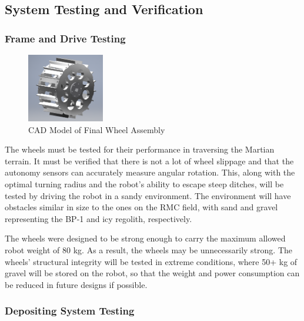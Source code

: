 \documentclass[class=article, crop=false]{standalone}
\begin{document}
	\subsection{System Testing and Verification}
	\label{subsec:system_testing_and_verification}
	
	
	
	\subsubsection{Frame and Drive Testing}
	
	\begin{figure}
		\centering
	 	\includegraphics[width=0.30\textwidth]{09_Figures/final_wheel.png}
	 	\caption{CAD Model of Final Wheel Assembly}
	 	\label{fig:final_wheel}
	\end{figure}	
	
	The wheels must be tested for their performance in traversing the Martian terrain. It must be verified that there is not a lot of wheel slippage and that the autonomy sensors can accurately measure angular rotation. This, along with the optimal turning radius and the robot's ability to escape steep ditches, will be tested by driving the robot in a sandy environment. The environment will have obstacles similar in size to the ones on the RMC field, with sand and gravel representing the BP-1 and icy regolith, respectively.

The wheels were designed to be strong enough to carry the maximum allowed robot weight of 80 kg.  As a result, the wheels may be unnecessarily strong. The wheels' structural integrity will be tested in extreme conditions, where 50+ kg of gravel will be stored on the robot, so that the weight and power consumption can be reduced in future designs if possible.

	\subsubsection{Depositing System Testing}
	
\end{document}
